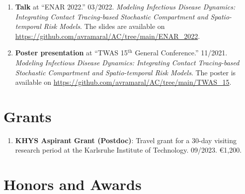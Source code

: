 \documentclass[10pt, ]{article}
\begin{document}
\begin{enumerate}[noitemsep, topsep=0pt]
		\item \textbf{Talk} at ``ENAR 2022.'' 03/2022. \textit{Modeling Infectious Disease Dynamics: Integrating Contact Tracing-based	Stochastic Compartment and Spatio-temporal Risk Models}. The slides are available on \href{https://github.com/avramaral/AC/tree/main/ENAR\_2022}{\url{https://github.com/avramaral/AC/tree/main/ENAR\_2022}}.
		
		\item \textbf{Poster presentation} at ``TWAS 15${}^{\text{th}}$ General Conference.'' 11/2021. \textit{Modeling Infectious Disease Dynamics: Integrating Contact Tracing-based	Stochastic Compartment and Spatio-temporal Risk Models}. The poster is available on \href{https://github.com/avramaral/AC/tree/main/TWAS\_15}{\url{https://github.com/avramaral/AC/tree/main/TWAS\_15}}.
	\end{enumerate}
	
	\noindent\makebox[\linewidth]{\rule{\paperwidth}{0.5pt}}

	\vspace{-12pt}
	\section*{Grants} \vspace{-5pt}
	
	\begin{enumerate}[noitemsep, topsep=0pt]
		\item \textbf{KHYS Aspirant Grant (Postdoc)}: Travel grant for a 30-day visiting research period at the Karlsruhe Institute of Technology. 09/2023. €1,200.
	\end{enumerate}
	
	\noindent\makebox[\linewidth]{\rule{\paperwidth}{0.5pt}}
	
	\vspace{-12pt}
	\section*{Honors and Awards} \vspace{-5pt}
	
\end{document}
